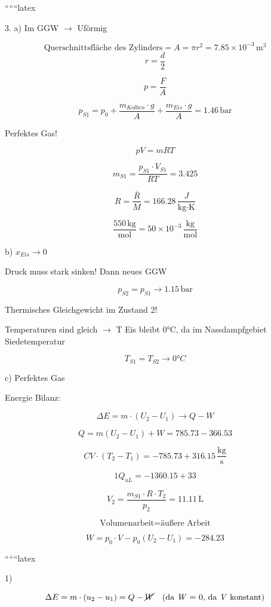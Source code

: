 
``````latex


3. a) Im GGW $\rightarrow$ Uförmig

\[
\text{Querschnittsfläche des Zylinders} = A = \pi r^2 = 7.85 \times 10^{-3} \, \text{m}^3
\]
\[
r = \frac{d}{2}
\]

\[
p = \frac{F}{A}
\]

\[
p_{S1} = p_0 + \frac{m_{Kolben} \cdot g}{A} + \frac{m_{Eis} \cdot g}{A} = 1.46 \, \text{bar}
\]

Perfektes Gas!

\[
p V = m RT
\]

\[
m_{S1} = \frac{p_{S1} \cdot V_{S1}}{RT} = 3.425
\]

\[
R = \frac{\bar{R}}{M} = 166.28 \, \frac{J}{\text{kg} \cdot \text{K}}
\]

\[
\frac{550 \, \text{kg}}{\text{mol}} = 50 \times 10^{-3} \, \frac{\text{kg}}{\text{mol}}
\]

b) $x_{Eis} \rightarrow 0$

Druck muss stark sinken! Dann neues GGW

\[
p_{S2} = p_{S1} \rightarrow 1.15 \, \text{bar}
\]

Thermisches Gleichgewicht im Zustand 2!

Temperaturen sind gleich $\rightarrow$ T Eis bleibt 0°C, da im Nassdampfgebiet Siedetemperatur

\[
T_{S1} = T_{S2} \rightarrow 0°C
\]

c) Perfektes Gas

Energie Bilanz:

\[
\Delta E = m \cdot (U_2 - U_1) \rightarrow Q - W
\]

\[
Q = m (U_2 - U_1) + W = 785.73 - 366.53
\]

\[
CV \cdot (T_2 - T_1) = -785.73 + 316.15 \, \frac{\text{kg}}{\text{s}}
\]

\[
1Q_{uL} = -1360.15 + 33
\]

\[
V_2 = \frac{m_{S1} \cdot R \cdot T_2}{p_2} = 11.11 \, \text{L}
\]

\[
\text{Volumenarbeit} = \text{äußere Arbeit}
\]

\[
W = p_0 \cdot V - p_0 (U_2 - U_1) = -284.23
\]

``````latex


1)  \rightarrow {}


\[
\Delta E = m \cdot (u_2 - u_1) = Q - \cancel{W} \quad \text{(da \textit{W} = 0, da \textit{V} konstant)}
\]

